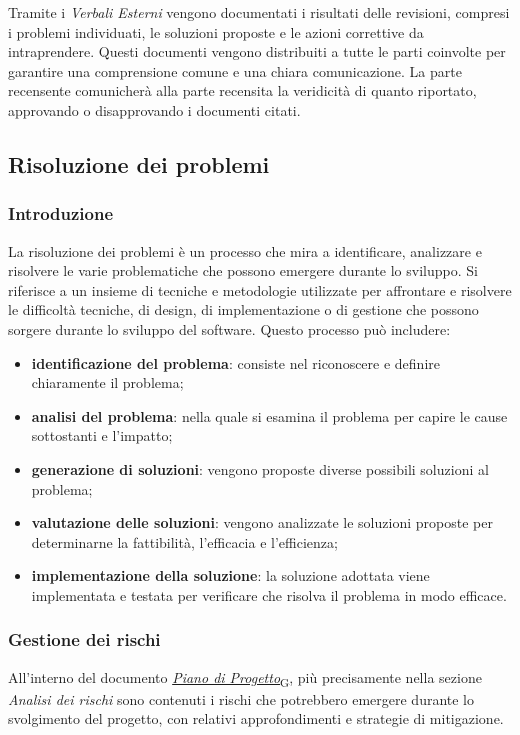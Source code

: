 Tramite i \textit{Verbali Esterni} vengono documentati i risultati delle revisioni, compresi i problemi individuati, le soluzioni proposte e le azioni correttive da intraprendere. Questi documenti vengono distribuiti a tutte le parti coinvolte per garantire una comprensione comune e una chiara comunicazione. La parte recensente comunicherà alla parte recensita la veridicità di quanto riportato, approvando o disapprovando i documenti citati.

\subsection{Risoluzione dei problemi}
\subsubsection{Introduzione}
La risoluzione dei problemi è un processo che mira a identificare, analizzare e risolvere le varie problematiche che possono emergere durante lo sviluppo. Si riferisce a un insieme di tecniche e metodologie utilizzate per affrontare e risolvere le difficoltà tecniche, di design, di implementazione o di gestione che possono sorgere durante lo sviluppo del software. Questo processo può includere:
\begin{itemize}
	\item \textbf{identificazione del problema}: consiste nel riconoscere e definire chiaramente il problema;
	\item \textbf{analisi del problema}: nella quale si esamina il problema per capire le cause sottostanti e l'impatto;
	\item \textbf{generazione di soluzioni}: vengono proposte diverse possibili soluzioni al problema;
	\item \textbf{valutazione delle soluzioni}: vengono analizzate le soluzioni proposte per determinarne la fattibilità, l'efficacia e l'efficienza;
	\item \textbf{implementazione della soluzione}: la soluzione adottata viene implementata e testata per verificare che risolva il problema in modo efficace.
\end{itemize}

\subsubsection{Gestione dei rischi}
All'interno del documento \href{https://7last.github.io/docs/pb/documentazione-interna/glossario\#piano-di-progetto}{\textit{Piano di Progetto}\textsubscript{G}}, più precisamente nella sezione \textit{Analisi dei rischi} sono contenuti i rischi che potrebbero emergere durante lo svolgimento del progetto, con relativi approfondimenti e strategie di mitigazione.

